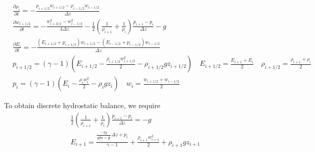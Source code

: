 \documentclass{report}
\begin{document}
\begin{align*}
&\frac{\partial \rho_{i}}{\partial t} = - \frac{ \rho_{i+1/2} w_{i+1/2} - \rho_{i-1/2} w_{i-1/2} }{\Delta z}\\
&\frac{\partial w_{i+1/2}}{\partial t} = -  \frac{ w_{i+3/2}^2 - w_{i-1/2}^2}{4\Delta z} - \frac{1}{2}\left(\frac{1}{\rho_{i+1}} +  \frac{1}{\rho_{i}}\right)\frac{ p_{i+1} - p_{i}}{\Delta z}  - g  \\
&\frac{\partial E_{i}}{\partial t} = - \frac{(E_{i+1/2} + p_{i+1/2}) w_{i+1/2} -  (E_{i-1/2} + p_{i-1/2}) w_{i-1/2}   }{\Delta z} \\
&p_{i+1/2} = (\gamma-1)\left( E_{i+1/2} - \frac{\rho_{i+1/2} w_{i+1/2}^2}{2} - \rho_{i+1/2} g z_{i+1/2} \right)
\quad E_{i+1/2} = \frac{E_{i+1} + E_{i}}{2} 
\quad \rho_{i+1/2} = \frac{\rho_{i+1} + \rho_{i}}{2} \\
&p_{i} = (\gamma-1)\left( E_{i} - \frac{\rho_{i} w_{i}^2}{2} - \rho_{i} g z_{i}\right) \quad w_{i} = \frac{w_{i+1/2} + w_{i-1/2}}{2}
\end{align*}



To obtain discrete hydrostatic balance, we require
\begin{align*}
   &\frac{1}{2}\left(\frac{1}{\rho_{i+1}} +  \frac{1}{\rho_{i}}\right)\frac{ p_{i+1} - p_{i}}{\Delta z}  = -g \\
   &E_{i+1}  = \frac{\frac{-2g}{\frac{1}{\rho_{i+1}} + \frac{1}{\rho_i}}\Delta z + p_i}{\gamma - 1} + \frac{\rho_{i+1}w_{i+1}^2}{2} + \rho_{i+1} g z_{i+1}
\end{align*}
\end{document}
